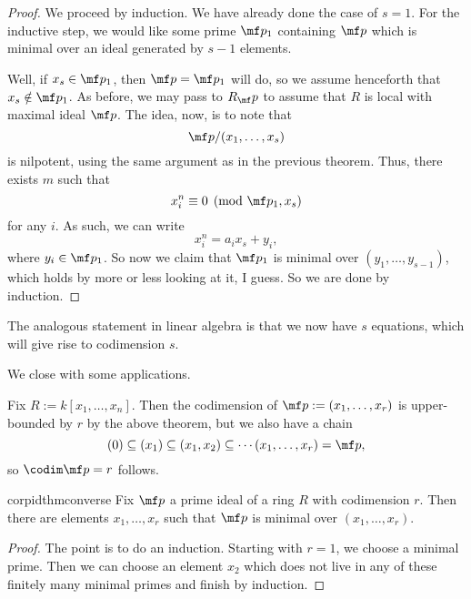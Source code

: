 \begin{proof}
	We proceed by induction. We have already done the case of $s=1$. For the inductive step, we would like some prime $\mf p_1$ containing $\mf p$ which is minimal over an ideal generated by $s-1$ elements.

	Well, if $x_s\in\mf p_1$, then $\mf p=\mf p_1$ will do, so we assume henceforth that $x_s\notin\mf p_1$. As before, we may pass to $R_\mf p$ to assume that $R$ is local with maximal ideal $\mf p$. The idea, now, is to note that
	\[\mf p/(x_1,\ldots,x_s)\]
	is nilpotent, using the same argument as in the previous theorem. Thus, there exists $m$ such that
	\[x_i^n\equiv0\pmod{\mf p_1,x_s}\]
	for any $i$. As such, we can write
	\[x_i^n=a_ix_s+y_i,\]
	where $y_i\in\mf p_1$. So now we claim that $\mf p_1$ is minimal over $(y_1,\ldots,y_{s-1})$, which holds by more or less looking at it, I guess. So we are done by induction.
\end{proof}
\begin{remark}
	The analogous statement in linear algebra is that we now have $s$ equations, which will give rise to codimension $s$.
\end{remark}
We close with some applications.
\begin{example}
	Fix $R:=k[x_1,\ldots,x_n]$. Then the codimension of $\mf p:=(x_1,\ldots,x_r)$ is upper-bounded by $r$ by the above theorem, but we also have a chain
	\[(0)\subseteq(x_1)\subseteq(x_1,x_2)\subseteq\cdots(x_1,\ldots,x_r)=\mf p,\]
	so $\codim\mf p=r$ follows.
\end{example}
\begin{restatable}{cor}{pidthmconverse}
	Fix $\mf p$ a prime ideal of a ring $R$ with codimension $r$. Then there are elements $x_1,\ldots,x_r$ such that $\mf p$ is minimal over $(x_1,\ldots,x_r)$.
\end{restatable} %
\begin{proof}
	The point is to do an induction. Starting with $r=1$, we choose a minimal prime. Then we can choose an element $x_2$ which does not live in any of these finitely many minimal primes and finish by induction.
\end{proof}